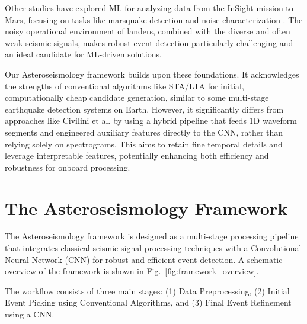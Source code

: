 \documentclass[conference]{IEEEtran}
\begin{document}
Other studies have explored ML for analyzing data from the InSight mission to Mars, focusing on tasks like marsquake detection and noise characterization \cite{b21}. The noisy operational environment of landers, combined with the diverse and often weak seismic signals, makes robust event detection particularly challenging and an ideal candidate for ML-driven solutions.

Our Asteroseismology framework builds upon these foundations. It acknowledges the strengths of conventional algorithms like STA/LTA for initial, computationally cheap candidate generation, similar to some multi-stage earthquake detection systems on Earth. However, it significantly differs from approaches like Civilini et al. \cite{favPaper} by using a hybrid pipeline that feeds 1D waveform segments and engineered auxiliary features directly to the CNN, rather than relying solely on spectrograms. This aims to retain fine temporal details and leverage interpretable features, potentially enhancing both efficiency and robustness for onboard processing.

\section{The Asteroseismology Framework}
\label{sec:methodology}
The Asteroseismology framework is designed as a multi-stage processing pipeline that integrates classical seismic signal processing techniques with a Convolutional Neural Network (CNN) for robust and efficient event detection. A schematic overview of the framework is shown in Fig.~\ref{fig:framework_overview}.


The workflow consists of three main stages: (1) Data Preprocessing, (2) Initial Event Picking using Conventional Algorithms, and (3) Final Event Refinement using a CNN.
\end{document}
